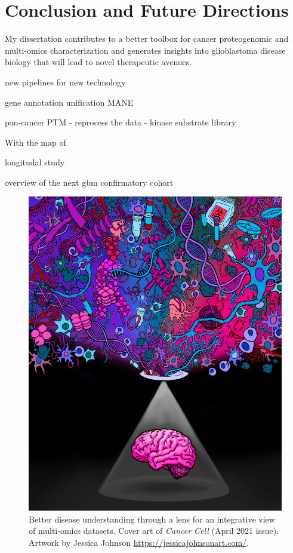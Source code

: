 \chapter{Conclusion and Future Directions}
\label{chap:conclusion}

My dissertation contributes to a better toolbox for cancer proteogenomic and multi-omics characterization and generates insights into glioblastoma disease biology that will lead to novel therapeutic avenues.


new pipelines for new technology

gene annotation unification MANE

pan-cancer PTM
- reprocess the data
- kinase substrate library



With the map of 

longitudal study

overview of the next gbm confirmatory cohort

\begin{figure}[tb]
    \centering
    \includegraphics[width=0.6\linewidth]{figures/chap05_conclusion/cptac_gbm_cancer_cell_cover.png}
    \caption[Better disease understanding through a lens for an integrative view of multi-omics datasets.]{Better disease understanding through a lens for an integrative view of multi-omics datasets. Cover art of \textit{Cancer Cell} (April 2021 issue). Artwork by Jessica Johnson \url{https://jessicajohnsonart.com/}.}
    \label{fig:lens-multi-omics}
\end{figure}

